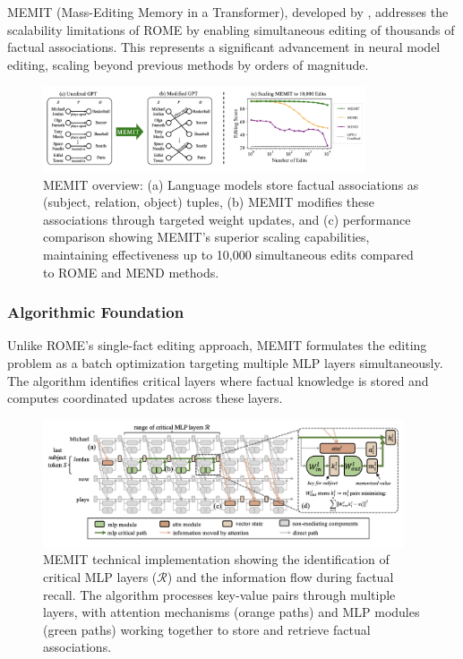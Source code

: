 MEMIT (Mass-Editing Memory in a Transformer), developed by \cite{meng_2022_memit}, addresses the scalability limitations of ROME by enabling simultaneous editing of thousands of factual associations. This represents a significant advancement in neural model editing, scaling beyond previous methods by orders of magnitude.

\begin{figure}[H]
\centering
\includegraphics[width=0.85\textwidth]{figures/MEMIT_fig1.png}
\caption{MEMIT overview: (a) Language models store factual associations as (subject, relation, object) tuples, (b) MEMIT modifies these associations through targeted weight updates, and (c) performance comparison showing MEMIT's superior scaling capabilities, maintaining effectiveness up to 10,000 simultaneous edits compared to ROME and MEND methods.}
\label{fig:memit_overview}
\end{figure}

\subsubsection{Algorithmic Foundation}

Unlike ROME's single-fact editing approach, MEMIT formulates the editing problem as a batch optimization targeting multiple MLP layers simultaneously. The algorithm identifies critical layers where factual knowledge is stored and computes coordinated updates across these layers.

\begin{figure}[H]
\centering
\includegraphics[width=0.95\textwidth]{figures/MEMIT_fig2.png}
\caption{MEMIT technical implementation showing the identification of critical MLP layers ($\mathcal{R}$) and the information flow during factual recall. The algorithm processes key-value pairs through multiple layers, with attention mechanisms (orange paths) and MLP modules (green paths) working together to store and retrieve factual associations.}
\label{fig:memit_technical}
\end{figure}


